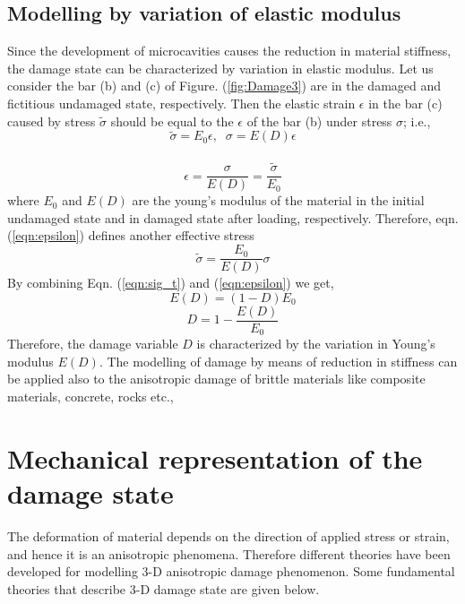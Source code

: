 \documentclass[12pt,twoside]{report}
\begin{document}
\subsection{Modelling by variation of elastic modulus} 
\indent\indent\indent Since the development of microcavities causes the reduction in material stiffness, the damage state can be characterized by variation in elastic modulus. Let us consider the bar (b) and (c) of Figure. (\ref{fig:Damage3}) are in the damaged and fictitious undamaged state, respectively. Then the elastic strain $\epsilon$ in the bar (c) caused by stress $\tilde{\sigma}$ should be equal to the $\epsilon$ of the bar (b) under stress $\sigma$; i.e.,\\
\begin{equation}
\label{eqn:sig_t2}
   \tilde{\sigma} = E_{0}\epsilon, \;\;  \sigma = E(D)\epsilon 
\end{equation}
\\
\begin{equation}
\label{eqn:epsilon}
\epsilon = \frac{\sigma}{E(D)} = \frac{\tilde{\sigma}}{E_{0}}
\end{equation}
where $E_{0}$ and $E(D)$ are the young's modulus of the material in the initial undamaged state and in damaged state after loading, respectively. Therefore, eqn. (\ref{eqn:epsilon}) defines another effective stress\\
\begin{equation}
\label{eqn:epsilon2}
  \tilde{\sigma} = \frac{E_{0}}{E(D)}\sigma
\end{equation}
By combining Eqn. (\ref{eqn:sig_t}) and (\ref{eqn:epsilon}) we get,
\begin{equation}
\label{eqn:E(d)}
E(D) = (1 - D) E_{0}
\end{equation}
\begin{equation}
\label{eqn:D2}
D  = 1 - \frac{E(D)}{E_{0}}
\end{equation}
Therefore, the damage variable $D$ is characterized by the variation in Young's modulus $E(D)$. The modelling of damage by means of reduction in stiffness can be applied also to the anisotropic damage of brittle materials like composite materials, concrete, rocks etc.,
\section{Mechanical representation of the damage state}
\indent\indent\indent The deformation of material depends on the direction of applied stress or strain, and hence it is an anisotropic phenomena. Therefore different theories have been developed for modelling 3-D anisotropic damage phenomenon. Some fundamental theories that describe 3-D damage state are given below. 
\end{document}
